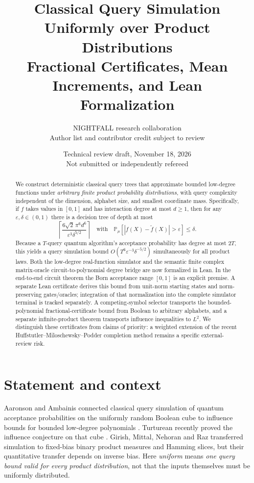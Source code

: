 \documentclass[11pt]{article}
\title{\textbf{Classical Query Simulation Uniformly over Product Distributions}\\[0.3em]\large Fractional Certificates, Mean Increments, and Lean Formalization}
\author{NIGHTFALL research collaboration\\\small Author list and contributor credit subject to review}
\date{Technical review draft, November 18, 2026\\\small Not submitted or independently refereed}
\newcommand{\Prb}{\mathbb P}
\begin{document}
\maketitle
\begin{abstract}
We construct deterministic classical query trees that approximate bounded low-degree functions under \emph{arbitrary finite product probability distributions}, with query complexity independent of the dimension, alphabet size, and smallest coordinate mass. Specifically, if $f$ takes values in $[0,1]$ and has interaction degree at most $d\ge1$, then for any $\varepsilon,\delta\in(0,1)$ there is a decision tree of depth at most
\[
\left\lceil\frac{6\sqrt2\,\pi^6 d^6}{\varepsilon^3\delta^{5/2}}\right\rceil
\quad\text{with}\quad
\Prb_\mu\!\left[|f(X)-\widetilde f(X)|>\varepsilon\right]\le\delta.
\]
Because a $T$-query quantum algorithm's acceptance probability has degree at most $2T$, this yields a query simulation bound $O(T^6\varepsilon^{-3}\delta^{-5/2})$ simultaneously for all product laws. Both the low-degree real-function simulator and the semantic finite complex matrix-oracle circuit-to-polynomial degree bridge are now formalized in Lean. In the end-to-end circuit theorem the Born acceptance range $[0,1]$ is an explicit premise. A separate Lean certificate derives this bound from unit-norm starting states and norm-preserving gates/oracles; integration of that normalization into the complete simulator terminal is tracked separately. A competing-symbol selector transports the bounded-polynomial fractional-certificate bound from Boolean to arbitrary alphabets, and a separate infinite-product theorem transports influence inequalities to $L^2$. We distinguish these certificates from claims of priority: a weighted extension of the recent Huffstutler--Miloschewsky--Podder completion method remains a specific external-review risk.
\end{abstract}

\section{Statement and context}
Aaronson and Ambainis connected classical query simulation of quantum acceptance probabilities on the uniformly random Boolean cube to influence bounds for bounded low-degree polynomials \cite{AA14}. Turturean recently proved the influence conjecture on that cube \cite{Tur26}. Girish, Mittal, Nehoran and Raz \cite{GMNR26} transferred simulation to fixed-bias binary product measures and Hamming slices, but their quantitative transfer depends on inverse bias. Here \emph{uniform} means \emph{one query bound valid for every product distribution}, not that the inputs themselves must be uniformly distributed.
\end{document}
